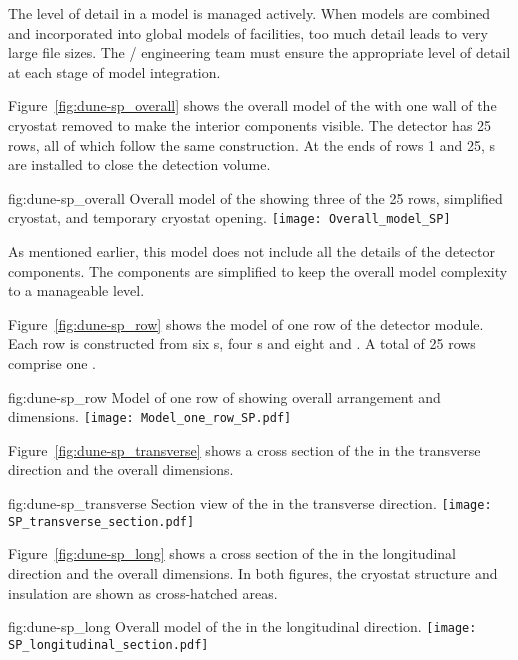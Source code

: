 The level of detail in a model is managed actively. When models are
combined and incorporated into global models of facilities, too much
detail leads to very large file sizes.  The /
engineering team must ensure the appropriate level of detail at each
stage of model integration.


Figure~\ref{fig:dune-sp_overall} shows the overall model of the
 with one wall of the cryostat  removed to make the
interior components visible. The detector has 25 rows, all of
which follow the same construction. At the ends of rows 1 and 25,
\endwall{}s are installed to close the detection volume.
\begin{dunefigure}{fig:dune-sp_overall}
  {Overall model of the  showing three of the 25 rows,
    simplified cryostat,  and temporary cryostat opening.}
  \texttt{[image: Overall\_model\_SP]}
\end{dunefigure}
As mentioned earlier, this model does not include all the details of
the detector components. The components are simplified to keep the
overall model complexity to a manageable level.


Figure~\ref{fig:dune-sp_row} shows the model of one row of the
detector module. Each row is constructed from six s, four
s and eight  and . A total of 25 rows
comprise one .
\begin{dunefigure}{fig:dune-sp_row}
  {Model of one row of  showing overall arrangement and dimensions.}
  \texttt{[image: Model\_one\_row\_SP.pdf]}
\end{dunefigure}


Figure~\ref{fig:dune-sp_transverse} shows a cross section of the
 in the transverse direction and the overall
dimensions.
\begin{dunefigure}{fig:dune-sp_transverse}
  {Section view of the  in the transverse
    direction.}
  \texttt{[image: SP\_transverse\_section.pdf]}
\end{dunefigure}
Figure~\ref{fig:dune-sp_long} shows a cross section of the
 in the longitudinal direction and the overall
dimensions. In both figures, the cryostat structure and insulation are shown
as cross-hatched areas.
\begin{dunefigure}{fig:dune-sp_long}
  {Overall model of the  in the longitudinal direction.}
  \texttt{[image: SP\_longitudinal\_section.pdf]}
\end{dunefigure}



